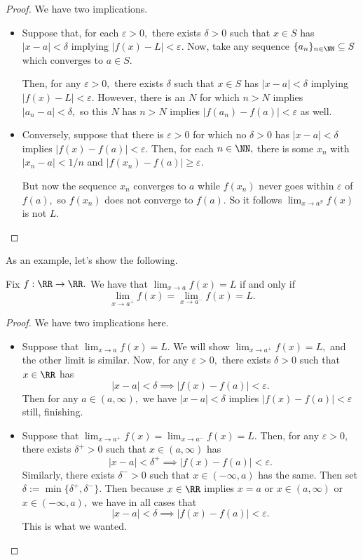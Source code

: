 \documentclass[../notes.tex]{subfiles}
\begin{document}
\begin{proof}
	We have two implications.
	\begin{itemize}
		\item Suppose that, for each $\varepsilon>0,$ there exists $\delta>0$ such that $x\in S$ has $|x-a|<\delta$ implying $|f(x)-L|<\varepsilon.$ Now, take any sequence $\{a_n\}_{n\in\NN}\subseteq S$ which converges to $a\in S.$

		Then, for any $\varepsilon>0,$ there exists $\delta$ such that $x\in S$ has $|x-a|<\delta$ implying $|f(x)-L|<\varepsilon.$ However, there is an $N$ for which $n>N$ implies $|a_n-a|<\delta,$ so this $N$ has $n>N$ implies $|f(a_n)-f(a)|<\varepsilon$ as well.

		\item Conversely, suppose that there is $\varepsilon>0$ for which no $\delta>0$ has $|x-a|<\delta$ implies $|f(x)-f(a)|<\varepsilon.$ Then, for each $n\in\NN,$ there is some $x_n$ with $|x_n-a|<1/n$ and $|f(x_n)-f(a)|\ge\varepsilon.$

		But now the sequence $x_n$ converges to $a$ while $f(x_n)$ never goes within $\varepsilon$ of $f(a),$ so $f(x_n)$ does not converge to $f(a).$ So it follows $\lim_{x\to a^S}f(x)$ is not $L.$
		\qedhere
	\end{itemize}
\end{proof}
As an example, let's show the following.
\begin{proposition}
	Fix $f:\RR\to\RR.$ We have that $\lim_{x\to a}f(x)=L$ if and only if
	\[\lim_{x\to a^+}f(x)=\lim_{x\to a^-}f(x)=L.\]
\end{proposition}
\begin{proof}
	We have two implications here.
	\begin{itemize}
		\item Suppose that $\lim_{x\to a}f(x)=L.$ We will show $\lim_{x\to a^+}f(x)=L,$ and the other limit is similar. Now, for any $\varepsilon>0,$ there exists $\delta>0$ such that $x\in\RR$ has
		\[|x-a|<\delta\implies|f(x)-f(a)|<\varepsilon.\] 
		Then for any $a\in(a,\infty),$ we have $|x-a|<\delta$ implies $|f(x)-f(a)|<\varepsilon$ still, finishing.
		\item Suppose that $\lim_{x\to a^+}f(x)=\lim_{x\to a^-}f(x)=L.$ Then, for any $\varepsilon>0,$ there exists $\delta^+>0$ such that $x\in(a,\infty)$ has
		\[|x-a|<\delta^+\implies|f(x)-f(a)|<\varepsilon.\]
		Similarly, there exists $\delta^->0$ such that $x\in(-\infty,a)$ has the same. Then set $\delta:=\min\{\delta^+,\delta^-\}.$ Then because $x\in\RR$ implies $x=a$ or $x\in(a,\infty)$ or $x\in(-\infty,a),$ we have in all cases that
		\[|x-a|<\delta\implies|f(x)-f(a)|<\varepsilon.\]
		This is what we wanted.
		\qedhere
	\end{itemize}
\end{proof}
\end{document}
